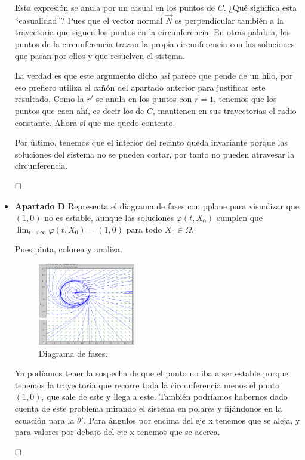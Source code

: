 \documentclass[spanish, a4paper, 12pt] {article}
\begin{document}
\begin{itemize}
{Esta expresión se anula por un casual en los puntos de $C$. ¿Qué significa esta ``casualidad''? Pues que el vector normal $\vec{N}$ es perpendicular también a la trayectoria que siguen los puntos en la circunferencia. En otras palabra, los puntos de la circunferencia trazan la propia circunferencia con las soluciones que pasan por ellos y que resuelven el sistema.

La verdad es que este argumento dicho así parece que pende de un hilo, por eso prefiero utiliza el cañón del apartado anterior para justificar este resultado. Como la $r'$ se anula en los puntos con $r = 1$, tenemos que los puntos que caen ahí, es decir los de $C$, mantienen en sus trayectorias el radio constante. Ahora sí que me quedo contento.

Por último, tenemos que el interior del recinto queda invariante porque las soluciones del sistema no se pueden cortar, por tanto no pueden atravesar la circunferencia.

$\hfill \square$
}
\item{
\textbf{Apartado D} Representa el diagrama de fases con pplane para visualizar que $(1, 0)$ no es estable, aunque las soluciones $\varphi(t, X_0)$ cumplen que $\lim_{t\rightarrow\infty}\varphi(t, X_0) = (1,0)$ para todo $X_0 \in \Omega$.

Pues pinta, colorea y analiza.

{\begin{figure}[!ht]
\centering
\includegraphics[width=0.4\textwidth]{plot.png}
\caption{Diagrama de fases.}
\end{figure}}

Ya podíamos tener la sospecha de que el punto no iba a ser estable porque tenemos la trayectoria que recorre toda la circunferencia menos el punto $(1,0)$, que sale de este y llega a este. También podríamos habernos dado cuenta de este problema mirando el sistema en polares y fijándonos en la ecuación para la $\theta'$. Para ángulos por encima del eje x tenemos que se aleja, y para valores por debajo del eje x tenemos que se acerca.

$\hfill \square$
}
\end{itemize}
\end{document}
